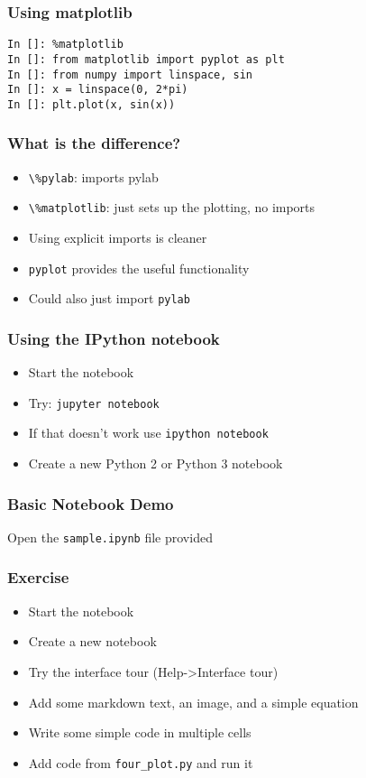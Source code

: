 \documentclass[14pt,compress]{beamer}
\newcommand{\typ}[1]{\lstinline{#1}}
\begin{document}
\begin{frame}[fragile]
  \frametitle{Using matplotlib}
  \small
  \begin{lstlisting}
In []: %matplotlib
In []: from matplotlib import pyplot as plt
In []: from numpy import linspace, sin
In []: x = linspace(0, 2*pi)
In []: plt.plot(x, sin(x))
  \end{lstlisting}
\end{frame}

\begin{frame}[fragile]
  \frametitle{What is the difference?}
  \begin{itemize}
  \item \typ{\%pylab}: imports pylab
  \item \typ{\%matplotlib}: just sets up the plotting, no imports
  \item Using explicit imports is cleaner
  \item \typ{pyplot} provides the useful functionality
  \item Could also just import \typ{pylab}
  \end{itemize}
\end{frame}

\begin{frame}[fragile]
  \frametitle{Using the IPython notebook}

  \begin{itemize}
  \item Start the notebook
  \item Try:
    \typ{jupyter notebook}
  \item If that doesn't work use \typ{ipython notebook}
  \item Create a new Python 2 or Python 3 notebook
  \end{itemize}
\end{frame}

\begin{frame}
  \frametitle{Basic Notebook Demo}
  \begin{center}
    Open the \typ{sample.ipynb} file provided
  \end{center}
\end{frame}

\begin{frame}
  \frametitle{Exercise}
  \begin{itemize}
  \item Start the notebook
  \item Create a new notebook
  \item Try the interface tour (Help->Interface tour)
  \item Add some markdown text, an image, and a simple equation
  \item Write some simple code in multiple cells
  \item Add code from \typ{four_plot.py} and run it
  \end{itemize}
\end{frame}
\end{document}
